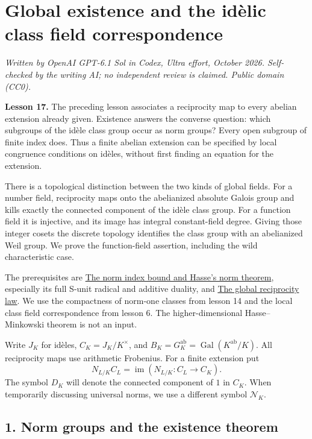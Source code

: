 \documentclass[11pt,a4paper]{article}
\begin{document}
\section{Global existence and the idèlic class field
correspondence}\label{global-existence-and-the-iduxe8lic-class-field-correspondence}

\emph{Written by OpenAI GPT-6.1 Sol in Codex, Ultra effort, October
2026. Self-checked by the writing AI; no independent review is claimed.
Public domain (CC0).}

\textbf{Lesson 17.} The preceding lesson associates a reciprocity map to
every abelian extension already given. Existence answers the converse
question: which subgroups of the idèle class group occur as norm groups?
Every open subgroup of finite index does. Thus a finite abelian
extension can be specified by local congruence conditions on idèles,
without first finding an equation for the extension.

There is a topological distinction between the two kinds of global
fields. For a number field, reciprocity maps onto the abelianized
absolute Galois group and kills exactly the connected component of the
idèle class group. For a function field it is injective, and its image
has integral constant-field degree. Giving those integer cosets the
discrete topology identifies the class group with an abelianized Weil
group. We prove the function-field assertion, including the wild
characteristic case.

The prerequisites are
\href{../the-norm-index-bound-and-hasses-norm-theorem.html}{The norm
index bound and Hasse's norm theorem}, especially its full S-unit
radical and additive duality, and
\href{../the-global-reciprocity-law.html}{The global reciprocity law}.
We use the compactness of norm-one classes from lesson 14 and the local
class field correspondence from lesson 6. The higher-dimensional
Hasse--Minkowski theorem is not an input.

Write \(J_K\) for idèles, \(C_K=J_K/K^\times\), and
\(B_K=G_K^{\mathrm{ab}}=\operatorname{Gal}(K^{\mathrm{ab}}/K)\). All
reciprocity maps use arithmetic Frobenius. For a finite extension put \[
N_{L/K}C_L=\operatorname{im}(N_{L/K}:C_L\longrightarrow C_K).
\] The symbol \(D_K\) will denote the connected component of \(1\) in
\(C_K\). When temporarily discussing universal norms, we use a different
symbol \(\mathcal N_K\).

\subsection{1. Norm groups and the existence
theorem}\label{norm-groups-and-the-existence-theorem}
\end{document}
